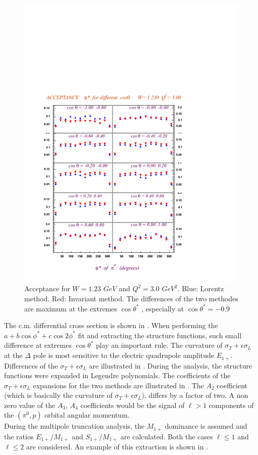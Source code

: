 \begin{figure}[t]
 \begin{center}
  \includegraphics[width = 12cm, bb = 0 20 480 540]{systematics/img/acc_phi_W1.23_Q23.00_mm0.080_ct0.95}
  \caption{Acceptance for $W=1.23$ $GeV$ and $Q^2=3.0$ $GeV^2$. Blue: Lorentz method. Red: Invariant method.
 The differences of the two methodes are maximum at the extremes $\cos\theta^*$ , especially at $\cos\theta^*=-0.9$}
  \label{fig:cmthetaacc}
 \end{center}
\end{figure} 
The c.m. differential cross section is shown in . When performing the $a+b\cos\phi^*+c\cos 2\phi^*$ fit
and extracting the structure functions, such small difference at extremes $\cos\theta^*$  play an important rule. The 
curvature of $\sigma_T + \epsilon\sigma_L$ at the $\Delta$ pole is most sensitive to the electric quadrupole amplitude 
$E_{1+}$.
Differences of the $\sigma_T + \epsilon\sigma_L$ are illustrated in . During the analysis, the structure functions
were expanded in Legendre polynomials. The coefficients of the $\sigma_T + \epsilon\sigma_L$ expansions for the two methods
are illustrated in . The $A_2$ coefficient (which is basically the curvature of $\sigma_T + \epsilon\sigma_L$), 
differs by a factor of two. A non zero value of the $A_3$, $A_4$ coefficients would be the signal of 
$\ell>1$ components of the $(\pi^0,p)$ orbital angular momentum. \\
During the multipole truncation analysis,
the $M_{1+}$ dominance is assumed and the ratios $E_{1+}/M_{1+}$ and $S_{1+}/M_{1+}$
are calculated. Both the cases $\ell \le 1$ and $\ell \le 2$ are considered. 
An example of this extraction is shown in .

